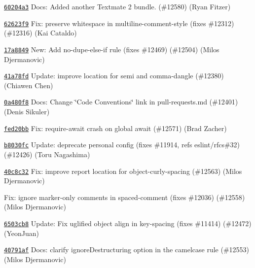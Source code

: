 \begin{DoxyItemize}
\item \href{https://github.com/eslint/eslint/commit/60204a3620e33a078c1c35fa2e5d839a16c627ff}{\texttt{ {\ttfamily 60204a3}}} Docs\+: Added another Textmate 2 bundle. (\#12580) (Ryan Fitzer)
\item \href{https://github.com/eslint/eslint/commit/62623f9f611a3adb79696304760a2fd14be8afbc}{\texttt{ {\ttfamily 62623f9}}} Fix\+: preserve whitespace in multiline-\/comment-\/style (fixes \#12312) (\#12316) (Kai Cataldo)
\item \href{https://github.com/eslint/eslint/commit/17a8849491a983f6cb8e98da8c0c9d52ff5f2aa6}{\texttt{ {\ttfamily 17a8849}}} New\+: Add no-\/dupe-\/else-\/if rule (fixes \#12469) (\#12504) (Milos Djermanovic)
\item \href{https://github.com/eslint/eslint/commit/41a78fd7ce245cad8ff6a96c42f5840688849427}{\texttt{ {\ttfamily 41a78fd}}} Update\+: improve location for semi and comma-\/dangle (\#12380) (Chiawen Chen)
\item \href{https://github.com/eslint/eslint/commit/0a480f8307a0e438032f484254941e6426748143}{\texttt{ {\ttfamily 0a480f8}}} Docs\+: Change \char`\"{}\+Code Conventions\char`\"{} link in pull-\/requests.\+md (\#12401) (Denis Sikuler)
\item \href{https://github.com/eslint/eslint/commit/fed20bb039cf9f53adfcf93e467f418c5e958f45}{\texttt{ {\ttfamily fed20bb}}} Fix\+: require-\/await crash on global await (\#12571) (Brad Zacher)
\item \href{https://github.com/eslint/eslint/commit/b8030fc23e88f57a04d955b3befd1ab0fc2c5d10}{\texttt{ {\ttfamily b8030fc}}} Update\+: deprecate personal config (fixes \#11914, refs eslint/rfcs\#32) (\#12426) (Toru Nagashima)
\item \href{https://github.com/eslint/eslint/commit/40c8c3264c7c383d98c9faf9c4cb4f8b75aee40f}{\texttt{ {\ttfamily 40c8c32}}} Fix\+: improve report location for object-\/curly-\/spacing (\#12563) (Milos Djermanovic)
\item \href{https://github.com/eslint/eslint/commit/1110045e0d28a461e75d2f57d5f01533d59ef239}{\texttt{ {}}} Fix\+: ignore marker-\/only comments in spaced-\/comment (fixes \#12036) (\#12558) (Milos Djermanovic)
\item \href{https://github.com/eslint/eslint/commit/6503cb8d99e549fece53b80b110e890a7978b9fd}{\texttt{ {\ttfamily 6503cb8}}} Update\+: Fix uglified object align in key-\/spacing (fixes \#11414) (\#12472) (Yeon\+Juan)
\item \href{https://github.com/eslint/eslint/commit/40791af69efde1701690637603ad37d41e15a727}{\texttt{ {\ttfamily 40791af}}} Docs\+: clarify ignore\+Destructuring option in the camelcase rule (\#12553) (Milos Djermanovic)

\end{DoxyItemize}
